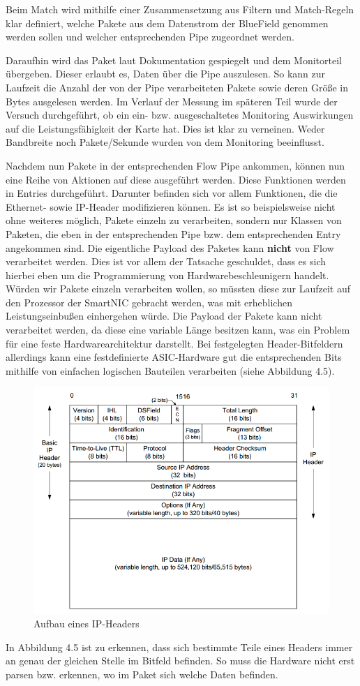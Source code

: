 Beim Match wird mithilfe einer Zusammensetzung aus Filtern und Match-Regeln klar definiert, welche Pakete aus dem Datenstrom der BlueField genommen werden sollen und welcher entsprechenden Pipe zugeordnet werden. 

Daraufhin wird das Paket laut Dokumentation gespiegelt und dem Monitorteil übergeben. Dieser erlaubt es, Daten über die Pipe auszulesen. So kann zur Laufzeit die Anzahl der von der Pipe verarbeiteten Pakete sowie deren Größe in Bytes ausgelesen werden. Im Verlauf der Messung im späteren Teil wurde der Versuch durchgeführt, ob ein ein- bzw. ausgeschaltetes Monitoring Auswirkungen auf die Leistungsfähigkeit der Karte hat. Dies ist klar zu verneinen. Weder Bandbreite noch Pakete/Sekunde wurden von dem Monitoring beeinflusst.

Nachdem nun Pakete in der entsprechenden Flow Pipe ankommen, können nun eine Reihe von Aktionen auf diese ausgeführt werden. Diese Funktionen werden in Entries durchgeführt. Darunter befinden sich vor allem Funktionen, die die Ethernet- sowie IP-Header modifizieren können. Es ist so beispielsweise nicht ohne weiteres möglich, Pakete einzeln zu verarbeiten, sondern nur Klassen von Paketen, die eben in der entsprechenden Pipe bzw. dem entsprechenden Entry angekommen sind. Die eigentliche Payload des Paketes kann \textbf{nicht} von Flow verarbeitet werden. Dies ist vor allem der Tatsache geschuldet, dass es sich hierbei eben um die Programmierung von Hardwarebeschleunigern handelt. Würden wir Pakete einzeln verarbeiten wollen, so müssten diese zur Laufzeit auf den Prozessor der SmartNIC gebracht werden, was mit erheblichen Leistungseinbußen einhergehen würde.
Die Payload der Pakete kann nicht verarbeitet werden, da diese eine variable Länge besitzen kann, was ein Problem für eine feste Hardwarearchitektur darstellt. Bei festgelegten Header-Bitfeldern allerdings kann eine festdefinierte ASIC-Hardware gut die entsprechenden Bits mithilfe von einfachen logischen Bauteilen verarbeiten (siehe Abbildung 4.5).  \cite{nvidia_doca_flow_v1_2} 
\begin{figure}
    \centering
    \includegraphics[width=0.8\linewidth]{images/figure_5-1.png}
    \caption{Aufbau eines IP-Headers}
    \label{fig:enter-label}
\end{figure}
In Abbildung 4.5 ist zu erkennen, dass sich bestimmte Teile eines Headers immer an genau der gleichen Stelle im Bitfeld befinden. So muss die Hardware nicht erst parsen bzw. erkennen, wo im Paket sich welche Daten befinden.

